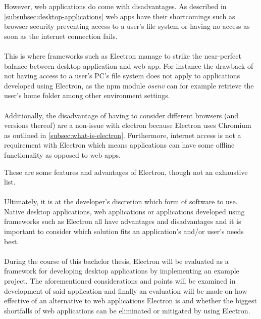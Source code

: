 
However, web applications do come with disadvantages. 
As described in \ref{subsubsec:desktop-applications} web apps have their shortcomings such as 
browser security preventing access to a user's file system or having no access as soon as the internet connection
fails.\paragraph{}
This is where frameworks such as Electron manage to strike the near-perfect balance between desktop application and web app.
For instance the drawback of not having access to a user's PC's file system does not apply to applications 
developed using Electron, as the npm module \emph{osenv} can for example retrieve the user's home folder among 
other environment settings. \parencite{osenv}\paragraph{}
Additionally, the disadvantage of having to consider different browsers (and versions thereof) are a non-issue
with electron because Electron uses Chromium as outlined in \ref{subsec:what-is-electron}. 
Furthermore, internet access is not a requirement with Electron which means applications can have some offline
functionality as opposed to web apps.\par
These are some features and advantages of Electron, though not an exhaustive list. \parencite{electronDocs}\paragraph{}
Ultimately, it is at the developer's discretion which form of software to use.
Native desktop applications, web applications or applications developed using frameworks such as Electron 
all have advantages and disadvantages and it is important to consider
which solution fits an application's and/or user's needs best.\paragraph{}
During the course of this bachelor thesis, Electron will be evaluated as a framework for developing desktop applications
by implementing an example project. 
The aforementioned considerations and points will be examined in development of said application and 
finally an evaluation will be made on how effective of an alternative to web applications Electron is 
and whether the biggest shortfalls of web applications can be eliminated or mitigated by 
using Electron.
